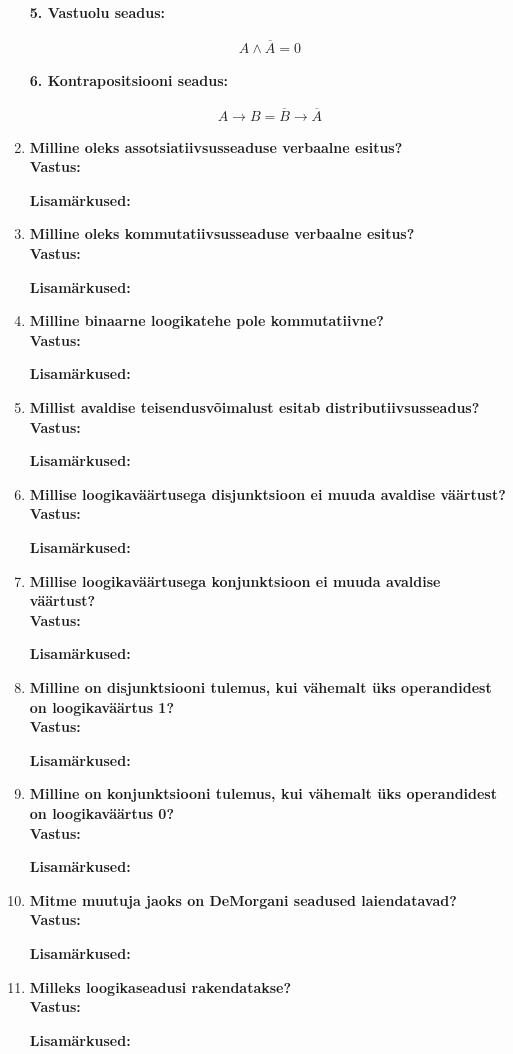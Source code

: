\documentclass[a4paper,12pt]{article}
\makeatletter
\newcommand{\hl}[1]{\begin{highlightbox}#1\end{highlightbox}}
\newenvironment{question}[1]{%
  \item \textbf{#1} \vspace{0.5em} \\ %
  \textbf{Vastus:} \vspace{0.25em} \\ %
  \def\@lisamarkused{} %
}{%
  \if\relax\detokenize\expandafter{\@lisamarkused}\relax %
  \else
    \vspace{0.5em} %
    \textbf{Lisamärkused:} \\ %
    \@lisamarkused %
  \fi
  \vspace{1em} %
}
\makeatother
\begin{document}
\begin{enumerate}[left=0pt]
 \textbf{5. Vastuolu seadus:}
 \hl{
   \[ 
    \begin{align*}   
     A \wedge \overline{A} = 0
    \end{align*}
   \] 
 }
 \leavevmode 

 \textbf{6. Kontrapositsiooni seadus: }
 \hl{
   \[ 
    \begin{align*}
      A \rightarrow B = \overline{B} \rightarrow \overline{A}
    \end{align*}
   \]  
 }

 \newpage 
  

 \begin{question}{Milline oleks assotsiatiivsusseaduse verbaalne esitus?}
 \end{question}

\begin{question}{Milline oleks kommutatiivsusseaduse verbaalne esitus?}
\end{question}

\begin{question}{Milline binaarne loogikatehe pole kommutatiivne?}
\end{question}

\begin{question}{Millist avaldise teisendusvõimalust esitab distributiivsusseadus?}
\end{question}

\begin{question}{Millise loogikaväärtusega disjunktsioon ei muuda avaldise väärtust?}
\end{question}

\begin{question}{Millise loogikaväärtusega konjunktsioon ei muuda avaldise väärtust?}
\end{question}

\begin{question}{Milline on disjunktsiooni tulemus, kui vähemalt üks operandidest on loogikaväärtus 1?}
\end{question}

\begin{question}{Milline on konjunktsiooni tulemus, kui vähemalt üks operandidest on loogikaväärtus 0?}
\end{question}

\begin{question}{Mitme muutuja jaoks on DeMorgani seadused laiendatavad?}
\end{question}

\begin{question}{Milleks loogikaseadusi rakendatakse?}
\end{question}


\end{enumerate}
\end{document}
